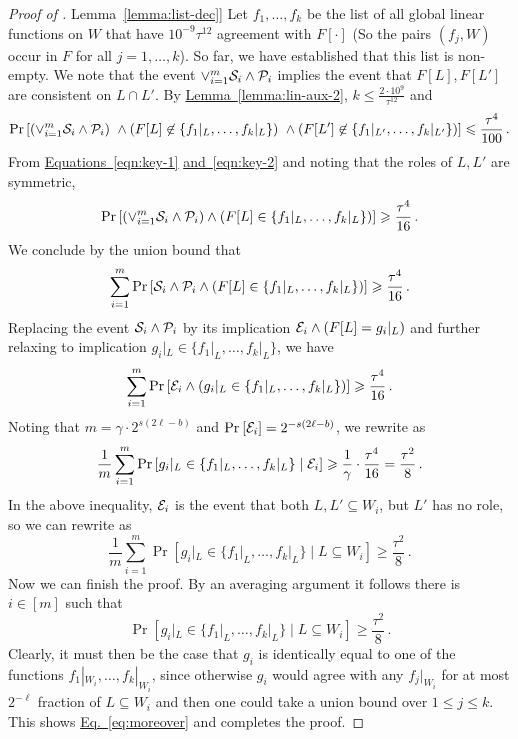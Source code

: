 \documentclass[11pt]{article}
\numberwithin{equation}{section}
\theoremstyle{definition}
\theoremstyle{plain}
\newcommand{\expref}[2]{\hyperref[#2]{#1~\ref{#2}}}
\newcommand{\expeqref}[2]{\hyperref[#2]{#1~\eqref{#2}}}
\newcommand\Prob[2]{{\Pr_{#1}\left[ {#2} \right]}}
\renewcommand\geq{\geqslant}
\renewcommand\leq{\leqslant}
\begin{document}
\begin{proof}[Proof of \expref{Lemma}{lemma:list-dec}]
\smallskip  Let $f_1, \ldots, f_k$ be the list of all global linear functions on $W$ that have $10^{-9}\tau^{12}$ agreement with
 $F[\cdot]$ (So the pairs $(f_j,W)$ occur in $F$ for all $j=1,\ldots,k$). So far, we have established that this list is non-empty. We note that the event $\vee_{i=1}^m {\cal S}_i \wedge {\cal P}_i$ implies the event that $F[L], F[L']$ are consistent on $L \cap L'$.
 By \expref{Lemma}{lemma:lin-aux-2}, $k \leq \frac{2 \cdot 10^9}{ \tau^{12}}$ and
 \begin{equation} \label{eqn:key-2}
  \Prob{}{\left(\vee_{i=1}^m {\cal S}_i \wedge {\cal P}_i\right) \ \wedge  (F[L] \not\in \{ f_1|_L, \ldots, f_k|_L\}) \ \wedge (F[L'] \not\in \{ f_1|_{L'}, \ldots, f_k|_{L'} \})}  \leq  \frac{\tau^4}{100}\,.
  \end{equation}
From \expeqref{Equations}{eqn:key-1} \expeqref{and}{eqn:key-2} and noting that the roles of $L, L'$ are symmetric,
  $$ \Prob{}{  \left(\vee_{i=1}^m {\cal S}_i \wedge {\cal P}_i\right) \wedge (F[L] \in   \{ f_1|_L, \ldots, f_k|_L\} )}  \geq  \frac{\tau^4}{16}\,. $$
%
We conclude %
by  %
the union bound that
 $$ \sum_{i=1}^m  \Prob{}{   {\cal S}_i \wedge {\cal P}_i  \wedge ( F[L] \in   \{ f_1|_L, \ldots, f_k|_L\}) }  \geq  \frac{\tau^4}{16}\,.$$
Replacing the event ${\cal S}_i \wedge {\cal P}_i$ by its implication ${\cal E}_i \wedge (F[L] = g_i|_L)$ and further relaxing to implication
$g_i|_L \in \{f_1|_L, \ldots, f_k|_L\}$, we have
 $$ \sum_{i=1}^m  \Prob{}{   {\cal E}_i   \wedge (g_i|_L  \in   \{ f_1|_L, \ldots, f_k|_L\}) }  \geq  \frac{\tau^4}{16}\,.$$
Noting that $m = \gamma \cdot 2^{s (2\ell-b)}$ and $\Prob{}{{\cal E}_i} = 2^{-s (2\ell-b)}$, we rewrite as
 $$  \frac{1}{m} \sum_{i=1}^m \Prob{}{g_i|_L \in  \{ f_1|_L, \ldots, f_k|_L\}  \mid {\cal E}_i } \geq  \frac{1}{\gamma} \cdot \frac{\tau^4}{16} = \frac{\tau^2}{8}\,.$$
In the above inequality, ${\cal E}_i$ is the event that both $L, L' \subseteq W_i$, but $L'$ has no role, so we can rewrite as
   $$  \frac{1}{m} \sum_{i=1}^m \Prob{}{g_i|_L \in  \{ f_1|_L, \ldots, f_k|_L\}  \mid L \subseteq W_i } \geq  \frac{\tau^2}{8}\,.$$
Now we can finish the proof. By an averaging argument it follows there is $i\in [m]$ such that
%
$$ \Prob{}{g_i|_L \in  \{ f_1|_L, \ldots, f_k|_L\}  \mid L \subseteq W_i } \geq  \frac{\tau^2}8\,.$$
Clearly, it must then be the case that $g_i$ is identically equal to one of the functions $f_1|_{W_i}, \ldots, f_k|_{W_i}$, since otherwise
$g_i$ would agree with any $f_j|_{W_i}$ for at most $2^{-\ell}$ fraction of $L \subseteq W_i$ and then one could take a union bound over $1 \leq j \leq k$. This shows
\expeqref{Eq.}{eq:moreover} and completes the proof.
\end{proof}
\end{document}
